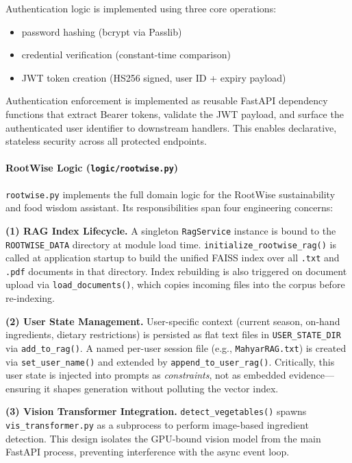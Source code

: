 \documentclass[11pt,twocolumn]{article}
\begin{document}
Authentication logic is implemented using three core operations:

\begin{itemize}
\item password hashing (bcrypt via Passlib)
\item credential verification (constant-time comparison)
\item JWT token creation (HS256 signed, user ID + expiry payload)
\end{itemize}

Authentication enforcement is implemented as reusable FastAPI dependency functions that extract Bearer tokens, validate the JWT payload, and surface the authenticated user identifier to downstream handlers. This enables declarative, stateless security across all protected endpoints.

\paragraph{RootWise Logic (\texttt{logic/rootwise.py})}

\texttt{rootwise.py} implements the full domain logic for the RootWise sustainability and food wisdom assistant. Its responsibilities span four engineering concerns:

\textbf{(1) RAG Index Lifecycle.} A singleton \texttt{RagService} instance is bound to the \texttt{ROOTWISE\_DATA} directory at module load time. \texttt{initialize\_rootwise\_rag()} is called at application startup to build the unified FAISS index over all \texttt{.txt} and \texttt{.pdf} documents in that directory. Index rebuilding is also triggered on document upload via \texttt{load\_documents()}, which copies incoming files into the corpus before re-indexing.

\textbf{(2) User State Management.} User-specific context (current season, on-hand ingredients, dietary restrictions) is persisted as flat text files in \texttt{USER\_STATE\_DIR} via \texttt{add\_to\_rag()}. A named per-user session file (e.g., \texttt{MahyarRAG.txt}) is created via \texttt{set\_user\_name()} and extended by \texttt{append\_to\_user\_rag()}. Critically, this user state is injected into prompts as \emph{constraints}, not as embedded evidence—ensuring it shapes generation without polluting the vector index.

\textbf{(3) Vision Transformer Integration.} \texttt{detect\_vegetables()} spawns \texttt{vis\_transformer.py} as a subprocess to perform image-based ingredient detection. This design isolates the GPU-bound vision model from the main FastAPI process, preventing interference with the async event loop.
\end{document}
